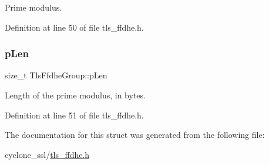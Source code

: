 Prime modulus. 



Definition at line 50 of file tls\+\_\+ffdhe.\+h.

\mbox{\label{structTlsFfdheGroup_a17b7822dbce7311d3bcfc86e9e213ef2}} 
\subsubsection{\texorpdfstring{p\+Len}{pLen}}
{\footnotesize\ttfamily size\+\_\+t Tls\+Ffdhe\+Group\+::p\+Len}



Length of the prime modulus, in bytes. 



Definition at line 51 of file tls\+\_\+ffdhe.\+h.



The documentation for this struct was generated from the following file\+:\begin{DoxyCompactItemize}
\item 
cyclone\+\_\+ssl/\hyperlink{tls__ffdhe_8h}{tls\+\_\+ffdhe.\+h}\end{DoxyCompactItemize}
